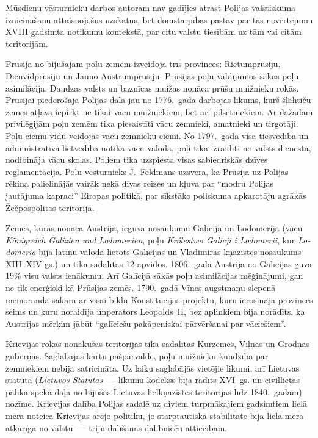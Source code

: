 \documentclass[twoside,a5paper,12pt,fleqn,openany]{extbook}
\newcommand{\pltxti}[1]{\textit{\textpolish{#1}}}
\newcommand{\detxti}[1]{\textit{\textgerman{#1}}}
\newcommand{\lttxti}[1]{\textit{\textlithuanian{#1}}}
\newcommand{\latxti}[1]{\textit{\textlatin{#1}}}
\begin{document}
Mūsdienu vēsturnieku darbos autoram nav gadījies atrast Polijas valstiskuma iznīcināšanu attaisnojošus uzskatus, bet domstarpības pastāv par tās novērtējumu XVIII gadsimta notikumu kontekstā, par citu valstu tiesībām uz tām vai citām teritorijām.

Prūsija no bijušajām poļu zemēm izveidoja trīs provinces: Rietumprūsiju, Dienvidprūsiju un Jauno Austrumprūsiju. Prūsijas poļu valdījumos sākās poļu asimilācija. Daudzas valsts un baznīcas muižas nonāca prūšu muižnieku rokās. Prūsijai piederošajā Polijas daļā jau no 1776.~gada darbojās likums, kurš šļahtiču zemes atļāva iepirkt ne tikai vācu muižniekiem, bet arī pilsētniekiem. Ar dažādām privilēģijām poļu zemēm tika piesaistīti vācu zemnieki, amatnieki un tirgotāji. Poļu ciemu vidū veidojās vācu zemnieku ciemi. No 1797.~gada visa tiesvedība un administratīvā lietvedība notika vācu valodā, poļi tika izraidīti no valsts dienesta, nodibināja vācu skolas. Poļiem tika uzspiesta visas sabiedriskās dzīves reglamentācija. Poļu vēsturnieks J.~Feldmans uzsvēra, ka Prūsija uz Polijas rēķina palielinājās vairāk nekā divas reizes un kļuva par ``modru Polijas jautājuma kapraci'' Eiropas politikā, par sīkstāko poliskuma apkarotāju agrākās Žečpospolitas teritorijā.

Zemes, kuras nonāca Austrijā, ieguva nosaukumu Galīcija un Lodomērija (vācu \detxti{Königreich Galizien und Lodomerien}, poļu \pltxti{Królestwo Galicji i Lodomerii}, kur \latxti{Lodomeria} bija latīņu valodā lietots Galīcijas un Vladimiras kņazistes nosaukums XIII--XIV gs.) un tika sadalītas 12 apvidos. 1806.~gadā Austrija no Galīcijas guva 19\% visu valsts ienākumu. Arī Galīcijā sākās poļu asimilācijas mēģinājumi, gan ne tik enerģiski kā Prūsijas zemēs. 1790.~gadā Vīnes augstmaņu slepenā memorandā sakarā ar visai biklu Konstitūcijas projektu, kuru ierosināja provinces seims un kuru noraidīja imperators Leopolds~II, bez aplinkiem bija norādīts, ka Austrijas mērķim jābūt ``galīciešu pakāpeniskai pārvēršanai par vāciešiem''.

Krievijas rokās nonākušās teritorijas tika sadalītas Kurzemes, Viļņas un Grodņas guberņās. Saglabājās kārtu pašpārvalde, poļu muižnieku kundzība pār zemniekiem nebija satricināta. Uz laiku saglabājās vietējie likumi, arī Lietuvas statuta (\lttxti{Lietuvos Statutas}~--- likumu kodekss bija radīts XVI~gs. un civillietās palika spēkā daļā no bijušās Lietuvas lielkņazistes teritorijas līdz 1840.~gadam) nozīme. Krievijas dalība Polijas sadalē uz diviem turpmākajiem gadsimtiem lielā mērā noteica Krievijas ārējo politiku, jo starptautiskā stabilitāte bija lielā mērā atkarīga no valstu~--- triju dalīšanas dalībnieču attiecībām.
\end{document}
